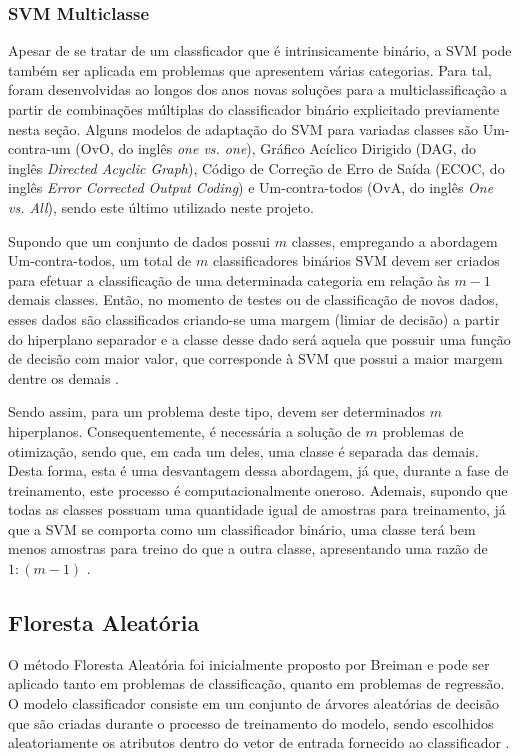 \subsubsection{SVM Multiclasse}

Apesar de se tratar de um classficador que é intrinsicamente binário, a SVM pode também ser aplicada em problemas que apresentem várias categorias. Para tal, foram desenvolvidas ao longos dos anos novas soluções para a multiclassificação a partir de combinações múltiplas do classificador binário explicitado previamente nesta seção. Alguns modelos de adaptação do SVM para variadas classes são Um-contra-um (OvO, do inglês \textit{one vs. one}), Gráfico Acíclico Dirigido (DAG, do inglês \textit{Directed Acyclic Graph}), Código de Correção de Erro de Saída (ECOC, do inglês \textit{Error Corrected Output Coding}) e Um-contra-todos (OvA, do inglês \textit{One vs. All}), sendo este último utilizado neste projeto.


Supondo que um conjunto de dados possui $m$ classes, empregando a abordagem Um-contra-todos, um total de $m$ classificadores binários SVM devem ser criados para efetuar a classificação de uma determinada categoria em relação às $m-1$ demais classes. Então, no momento de testes ou de classificação de novos dados, esses dados são classificados criando-se uma margem (limiar de decisão) a partir do hiperplano separador e a classe desse dado será aquela que possuir uma função de decisão com maior valor, que corresponde à SVM que possui a maior margem dentre os demais  .

Sendo assim, para um problema deste tipo, devem ser determinados $m$ hiperplanos. Consequentemente, é necessária a solução de $m$ problemas de otimização, sendo que, em cada um deles, uma classe é separada das demais. Desta forma, esta é uma desvantagem dessa abordagem, já que, durante a fase de treinamento, este processo é computacionalmente oneroso. Ademais, supondo que todas as classes possuam uma quantidade igual de amostras para treinamento, já que a SVM se comporta como um classificador binário, uma classe terá bem menos amostras para treino do que a outra classe, apresentando uma razão de $1:(m-1)$ .



\subsection{Floresta Aleatória}

O método Floresta Aleatória foi inicialmente proposto por Breiman  e pode ser aplicado tanto em problemas de classificação, quanto em problemas de regressão. O modelo classificador consiste em um conjunto de árvores aleatórias de decisão que são criadas durante o processo de treinamento do modelo, sendo escolhidos aleatoriamente os atributos dentro do vetor de entrada fornecido ao classificador .

